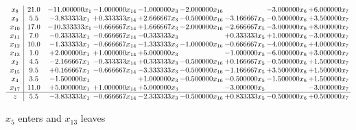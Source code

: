 \documentclass[10pt]{article}
\begin{document}
 \[\begin{array}{c| c c@{\hskip 2pt} c@{\hskip 2pt} c@{\hskip 2pt} c@{\hskip 2pt} c@{\hskip 2pt} c@{\hskip 2pt} c@{\hskip 2pt} }
 x_{8}   &  21.0 & -11.000000 x_{1} & -1.000000 x_{14} & -1.000000 x_{3} & -2.000000 x_{16} &   & -3.000000 x_{6} & + 6.000000 x_{7}\\
 x_{9}   &  5.5 & -3.833333 x_{1} & + 0.333333 x_{14} & + 2.666667 x_{3} & -0.500000 x_{16} & -3.166667 x_{5} & -0.500000 x_{6} & + 3.500000 x_{7}\\
 x_{10}   &  17.0 & -10.333333 x_{1} & -0.666667 x_{14} & + 1.666667 x_{3} & -2.000000 x_{16} & -2.666667 x_{5} & -3.000000 x_{6} & + 8.000000 x_{7}\\
 x_{11}   &  7.0 & -0.333333 x_{1} & -0.666667 x_{14} & -0.333333 x_{3} &   & + 0.333333 x_{5} & + 1.000000 x_{6} & -3.000000 x_{7}\\
 x_{12}   &  10.0 & -1.333333 x_{1} & -0.666667 x_{14} & -1.333333 x_{3} & -1.000000 x_{16} & -0.666667 x_{5} & -4.000000 x_{6} & + 4.000000 x_{7}\\
 x_{13}   &  1.0 & + 2.000000 x_{1} & + 1.000000 x_{14} & + 5.000000 x_{3} &   & -1.000000 x_{5} & -6.000000 x_{6} & + 3.000000 x_{7}\\
 x_{2}   &  4.5 & -2.166667 x_{1} & -0.333333 x_{14} & + 0.333333 x_{3} & -0.500000 x_{16} & + 0.166667 x_{5} & -0.500000 x_{6} & + 1.500000 x_{7}\\
 x_{15}   &  9.5 & + 0.166667 x_{1} & -0.666667 x_{14} & -3.333333 x_{3} & -0.500000 x_{16} & -1.166667 x_{5} & + 3.500000 x_{6} & + 1.500000 x_{7}\\
 x_{4}   &  3.5 & -1.500000 x_{1} &   & + 1.000000 x_{3} & -0.500000 x_{16} & -0.500000 x_{5} & -1.500000 x_{6} & + 1.500000 x_{7}\\
 x_{17}   &  11.0 & + 5.000000 x_{1} & + 1.000000 x_{14} & + 5.000000 x_{3} &   & -3.000000 x_{5} &   & -3.000000 x_{7}\\
\hline
z    &  5.5 & -3.833333 x_{1} & -0.666667 x_{14} & -2.333333 x_{3} & -0.500000 x_{16} & + 0.833333 x_{5} & -0.500000 x_{6} & + 0.500000 x_{7}\\
\end{array}\]


 $ x_{5} $ enters and $ x_{13} $ leaves 
\end{document}
